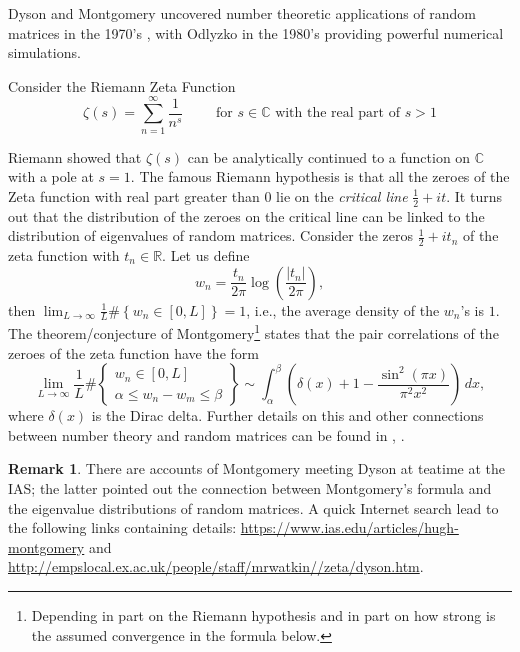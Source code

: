 \documentclass[letterpaper,11pt,oneside,reqno]{amsart}
\numberwithin{equation}{section}
\theoremstyle{definition}
\newtheorem{remark}[proposition]{Remark}
\begin{document}
Dyson and Montgomery uncovered number theoretic applications of random matrices 
in the 1970's \cite{montgomery1973pair}, with Odlyzko in the 1980's \cite{odlyzko1987distribution} providing powerful numerical simulations.

Consider the Riemann Zeta Function
\begin{equation*}
\zeta(s)=\sum_{n=1}^{\infty}\frac{1}{n^s} \qquad \text{ for } s\in \mathbb C \text{ with the real part of } s>1
\end{equation*}

Riemann showed that $\zeta(s)$ can be analytically continued to a function on
$\mathbb C$ with a pole at $s=1$.  The famous Riemann hypothesis is that all
the zeroes of the Zeta function with real part greater than 0 lie on the
\emph{critical line} $\frac{1}2+i t$.  It turns out that the distribution of
the zeroes on the critical line can be linked to the distribution of
eigenvalues of random matrices.  Consider the zeros $\frac12+it_n$ of the zeta function
with $t_n\in\mathbb{R}$. Let us define
\begin{equation*}
w_n=\frac{t_n}{2\pi}\log\left(\frac{|t_n|}{2\pi}\right),
\end{equation*}
then $\displaystyle \lim_{L\to\infty} \frac{1}{L} \#\left\{w_n\in [0,L]\right\}=1$, i.e., the 
average density of the $w_n$'s is $1$.
The theorem/conjecture of Montgomery\footnote{Depending in part
on the Riemann hypothesis and in part on 
how strong is the assumed convergence in the formula below.} states that the pair correlations of the 
zeroes of the zeta function have the form
\begin{equation*}
\lim_{L\to\infty} \frac{1}{L}\# \left\{\begin{array}{c} w_n\in [0,L] \\ \alpha\leq w_n-w_m\leq \beta \end{array}\right\} 
\sim \int_\alpha^\beta \left(\delta(x)+1 -\frac{\sin^2(\pi x)}{\pi^2 x^2}\right)\, dx,
\end{equation*}
where $\delta(x)$ is the Dirac delta.
Further details on this and other connections
between number theory and random matrices
can be found in \cite{keating2000random}, \cite{keating2006random}.

\begin{remark}
	There are accounts of Montgomery 
	meeting Dyson at teatime at the IAS; the latter pointed
	out the connection between Montgomery's formula and the eigenvalue
	distributions of random matrices. 
	A quick Internet search lead to the following links containing details:
	\url{https://www.ias.edu/articles/hugh-montgomery} and
	\url{http://empslocal.ex.ac.uk/people/staff/mrwatkin//zeta/dyson.htm}.
\end{remark}
\end{document}
